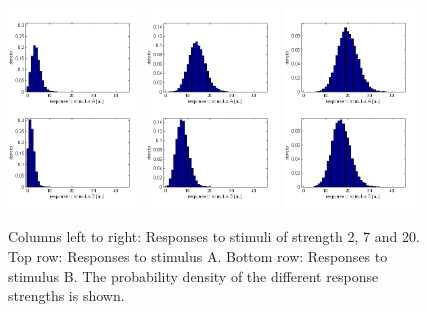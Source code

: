 \documentclass{scrartcl}
\begin{document}
\begin{figure}
\centering
\includegraphics[trim = {0.1cm 0.6cm 0.9cm 1.1cm}, width=0.315\textwidth, clip]{../pics/dens2}
\includegraphics[trim = {0.1cm 0.6cm 0.9cm 1.1cm}, width=0.315\textwidth, clip]{../pics/dens7}
\includegraphics[trim = {0.1cm 0.6cm 0.9cm 1.1cm}, width=0.315\textwidth, clip]{../pics/dens20}
\caption{Columns left to right: Responses to stimuli of strength 2, 7 and 20. Top row: Responses to stimulus A. Bottom row: Responses to stimulus B. The probability density of the different response strengths is shown.}
\label{pdf}
\end{figure}
\end{document}
